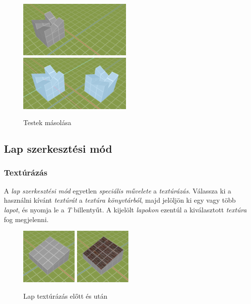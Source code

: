 \begin{figure}[H]
    \centering
    \includegraphics[width=0.5\textwidth]{parts/user-documentation/editor/images/copy1.png}
    \includegraphics[width=0.5\textwidth]{parts/user-documentation/editor/images/copy2.png}
    \caption{Testek másolása}
\end{figure}

\subsection{Lap szerkesztési mód}

\subsubsection{Textúrázás}

A \emph{lap szerkesztési mód} egyetlen \emph{speciális művelete} a \emph{textúrázás}. Válassza ki a használni kívánt \emph{textúrát} a \emph{textúra könyvtárból}, majd jelöljön ki egy vagy több
\emph{lapot}, és nyomja le a \emph{T} billentyűt. A kijelölt \emph{lapokon} ezentúl a kiválasztott
\emph{textúra} fog megjelenni.

\begin{figure}[H]
    \centering
    \includegraphics[width=0.25\textwidth]{parts/user-documentation/editor/images/tex1.png}
    \includegraphics[width=0.25\textwidth]{parts/user-documentation/editor/images/tex2.png}
    \caption{Lap textúrázás előtt és után}
\end{figure}

